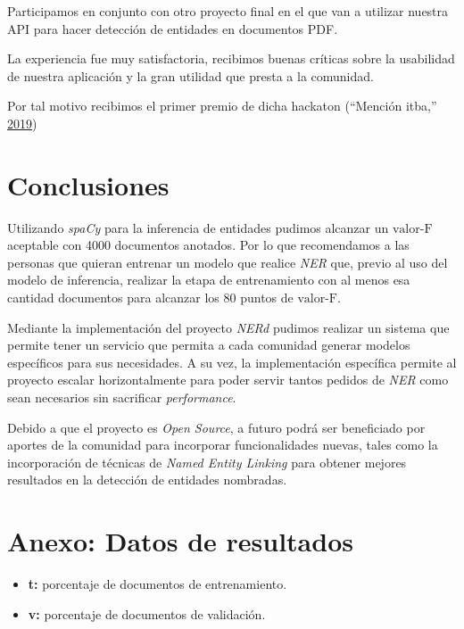 \documentclass[12pt,a4paper,]{scrartcl}
\providecommand{\tightlist}{%
  \setlength{\itemsep}{0pt}\setlength{\parskip}{0pt}}
\begin{document}
Participamos en conjunto con otro proyecto final en el que van a utilizar nuestra API para hacer detección de entidades en documentos PDF.

La experiencia fue muy satisfactoria, recibimos buenas críticas sobre la usabilidad de nuestra aplicación y la gran utilidad que presta a la comunidad.

Por tal motivo recibimos el primer premio de dicha hackaton (``Mención itba,'' \protect\hyperlink{ref-mediaparty2019_win}{2019})

\newpage

\hypertarget{conclusiones}{%
\section{Conclusiones}\label{conclusiones}}

Utilizando \emph{spaCy} para la inferencia de entidades pudimos alcanzar un \(\text{valor-F}\) aceptable con 4000 documentos anotados. Por lo que recomendamos a las personas que quieran entrenar un modelo que realice \emph{NER} que, previo al uso del modelo de inferencia, realizar la etapa de entrenamiento con al menos esa cantidad documentos para alcanzar los 80 puntos de \(\text{valor-F}\).

Mediante la implementación del proyecto \emph{NERd} pudimos realizar un sistema que permite tener un servicio que permita a cada comunidad generar modelos específicos para sus necesidades. A su vez, la implementación específica permite al proyecto escalar horizontalmente para poder servir tantos pedidos de \emph{NER} como sean necesarios sin sacrificar \emph{performance}.

Debido a que el proyecto es \emph{Open Source}, a futuro podrá ser beneficiado por aportes de la comunidad para incorporar funcionalidades nuevas, tales como la incorporación de técnicas de \emph{Named Entity Linking} para obtener mejores resultados en la detección de entidades nombradas.

\newpage

\hypertarget{anexo-datos-de-resultados}{%
\section*{Anexo: Datos de resultados}\label{anexo-datos-de-resultados}}

\begin{itemize}
\tightlist
\item
  \textbf{t:} porcentaje de documentos de entrenamiento.
\item
  \textbf{v:} porcentaje de documentos de validación.
\end{itemize}
\end{document}
